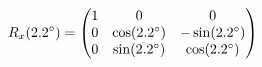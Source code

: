 \documentclass[preview]{standalone}
\begin{document}
\begin{align*}
\special{dvisvgm:raw <g id='unique000'>}R_x(2.2^\circ) = \begin{pmatrix} 1 & 0 & 0 \\ 0 & \cos(2.2^\circ) & -\sin(2.2^\circ) \\ 0 & \sin(2.2^\circ) & \cos(2.2^\circ) \end{pmatrix}\special{dvisvgm:raw </g>}
\end{align*}
\end{document}
